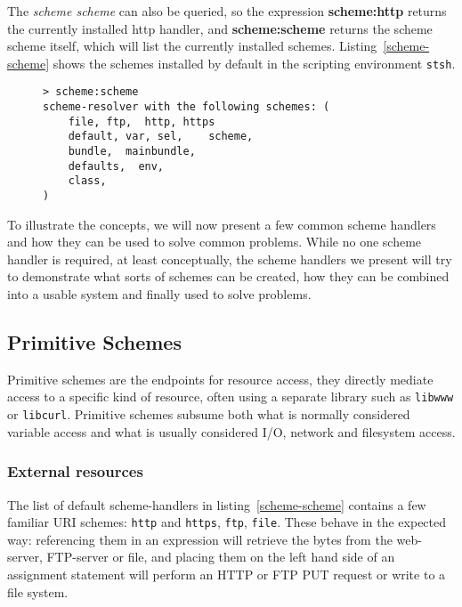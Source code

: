 \documentclass[preprint,authoryear]{acm_proc_article-sp}
\begin{document}
The {\em scheme scheme} can also be queried,
so the expression {\bf scheme:http} returns the currently installed http handler, and 
{\bf scheme:scheme} returns the scheme scheme itself, which will list the currently
installed schemes.  Listing~\ref{scheme-scheme} shows the schemes installed by
default in the scripting environment {\tt stsh}.

\begin{figure}[htbp]
\begin{lstlisting}[style=L,label=scheme-scheme,caption=List of schemes via scheme:scheme.]
> scheme:scheme 
scheme-resolver with the following schemes: (
    file, ftp,  http, https
    default, var, sel,    scheme,
    bundle,  mainbundle,
    defaults,  env,
    class,
)
\end{lstlisting}
\end{figure}

To illustrate the concepts, we will now present a few common scheme handlers and how they can be
used to solve common problems.  While no one scheme handler is required, at least conceptually,
the scheme handlers we present will try to demonstrate what sorts of schemes can be created,
how they can be combined into a usable system and finally used to solve problems.

\subsection{Primitive Schemes}
\label{primitiveSchemes}

Primitive schemes are the endpoints for resource access, they directly
mediate access to a specific kind of resource, often using a separate
library such as {\tt libwww} or {\tt libcurl}.  Primitive schemes
subsume both what is normally considered variable access and 
what is usually considered I/O, network and filesystem access.


\subsubsection{External resources}
\label{externalResources}

The list of default scheme-handlers in listing~\ref{scheme-scheme} contains a few familiar URI schemes:
{\tt http} and {\tt https}, {\tt ftp}, {\tt file}.   These behave in the expected way:   referencing them in an expression will
retrieve the bytes from the web-server, FTP-server or file, and placing them on the left hand side of
an assignment statement will perform an HTTP or FTP PUT request or write to a file system. 
 
\end{document}
